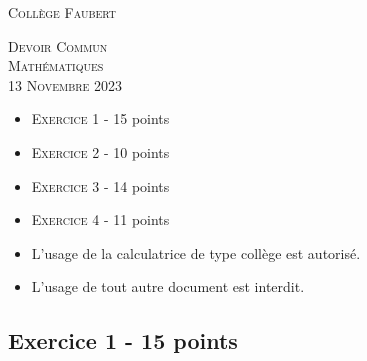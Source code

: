





\begin{center} %

\textsc{\LARGE Collège Faubert}\\

\horrule{2px}

\textsc{\large Devoir Commun}\\%
\textsc{\large Mathématiques}\\%
\textsc{\large 13 Novembre 2023}\\

\horrule{2px}

\begin{itemize}[label={$\bullet$}]
  \item \textsc{Exercice 1} - 15 points     
  \item \textsc{Exercice 2} - 10 points 
  \item \textsc{Exercice 3} - 14 points 
  \item \textsc{Exercice 4} - 11 points 
\end{itemize}

\horrule{1px}

\begin{itemize}
  \item L'usage de la calculatrice de type collège est autorisé.
  \item L'usage de tout autre document est interdit. 
\end{itemize}

\horrule{2px}

\end{center} 


\subsection*{Exercice 1 - 15 points}

